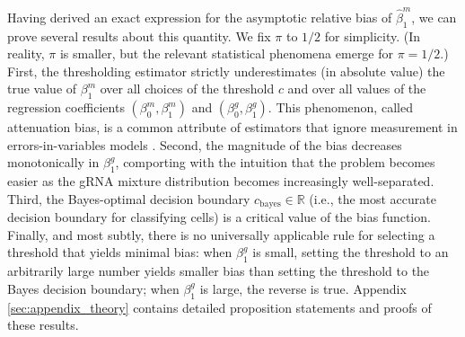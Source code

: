 \documentclass[12pt]{article}
\begin{document}
Having derived an exact expression for the asymptotic relative bias of $\hat{\beta}^m_1$, we can prove several results about this quantity. We fix $\pi$ to $1/2$ for simplicity. (In reality, $\pi$ is smaller, but the relevant statistical phenomena emerge for $\pi = 1/2$.) First, the thresholding estimator strictly underestimates (in absolute value) the true value of $\beta^m_1$ over all choices of the threshold $c$ and over all values of the regression coefficients $(\beta^m_0, \beta^m_1)$ and $(\beta^g_0, \beta^g_1)$. This phenomenon, called attenuation bias, is a common attribute of estimators that ignore measurement in errors-in-variables models \parencite{Stefanski2000a}. Second, the magnitude of the bias decreases monotonically in $\beta^g_1$, comporting with the intuition that the problem becomes easier as the gRNA mixture distribution becomes increasingly well-separated. Third, the Bayes-optimal decision boundary $c_\textrm{bayes} \in \mathbb{R}$ (i.e., the most accurate decision boundary for classifying cells) is a critical value of the bias function. Finally, and most subtly, there is no universally applicable rule for selecting a threshold that yields minimal bias: when $\beta^g_1$ is small, setting the threshold to an arbitrarily large number yields smaller bias than setting the threshold to the Bayes decision boundary; when $\beta^g_1$ is large, the reverse is true. Appendix \ref{sec:appendix_theory} contains detailed proposition statements and proofs of these results.
\end{document}
